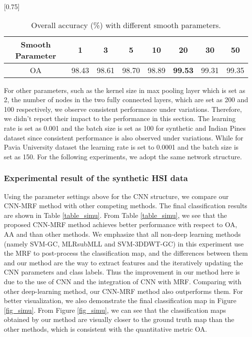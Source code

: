 \documentclass[journal]{IEEEtran}
\begin{document}
		\begin{table}[htp]
			\caption{\label{smoothparameter} {{Overall accuracy (\%) with different smooth parameters.}}}
			\begin{center}
				{\normalsize
					\scalebox{0.75}[0.75]
					{
						\begin{tabular}{|c|c|c|c|c|c|c|c|}
							\hline
							Smooth Parameter& 1    & 3    & 5   & 10  & 20  & 30   & 50 \\
							\hline
							OA      & 98.43  & 98.61  & 98.70 & 98.89 & \bf{99.53} & 99.31 & 99.35\\
							\hline
						\end{tabular}
					}
				}
			\end{center}
		\end{table}
		
		For other parameters, such as the kernel size in max pooling layer which is set as 2, the number of nodes in the two fully connected layers, which are set as 200 and 100 respectively, we {{observe}} consistent performance under variations. Therefore, we {{didn't}} report their impact to the performance in this section. {{The learning rate  is set as 0.001 and the batch size  is set as 100 for synthetic and Indian Pines dataset since consistent performance is also observed under variations. While for Pavia University dataset the learning rate is set to 0.0001 and the batch size  is set as 150. For the following experiments, we adopt the same network structure.}}
		
		\subsubsection{Experimental result of the synthetic HSI data}
		{{Using the parameter settings above for the CNN structure, we compare our CNN-MRF method with other competing methods. The final classification results are shown in Table \ref{table_simu}}}.  From Table \ref{table_simu}, we see that the proposed CNN-MRF method achieves better performance with respect to OA, AA and  than other methods. We emphasize that all non-deep learning methods {{(namely SVM-GC, MLRsubMLL and SVM-3DDWT-GC)}} in this experiment use the MRF to post-process the classification map, and the differences between them and our method are the way to extract features {{and the iteratively updating the CNN parameters and class labels.}} Thus the improvement in our method here is due to the use of CNN {{and the integration of CNN with MRF. Comparing with other deep-learning method, our CNN-MRF method also outperforms them. For better visualization, we also demonstrate the final classification map in Figure \ref{fig_simu}.}} From Figure \ref{fig_simu}, we can see that the classification 
maps obtained by our method are visually closer to the ground truth map than the other methods, which is consistent with the quantitative metric OA. 
		
\end{document}
